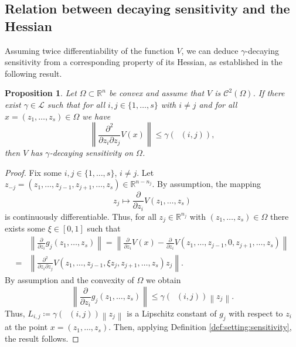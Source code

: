 \documentclass{article}
\newcommand{\R}{\mathbb{R}}
\newcommand{\Rn}{\R^n}
\newcommand{\C}{\mathcal{C}}
\renewcommand{\L}{\mathcal{L}}
\DeclareMathOperator{\distG}{\operatorname{dist_\mathcal{G}}} %
\newcommand{\agents}{\lbrace 1, \dots, s \rbrace}
\newcommand{\norm}[1]{\left\lVert {#1} \right\rVert}
\newtheorem{prop}{Proposition}[section]
\begin{document}
\subsection{Relation between decaying sensitivity and the Hessian}
Assuming twice differentiability of the function $V$, we can deduce $\gamma$-decaying sensitivity from a corresponding property of its Hessian, as established in the following result.
\begin{prop} \label{prop:Decay_Hessian}
    Let $\Omega \subset \Rn$ be convex and assume that $V$ is $\C^2(\Omega)$. If there exist $\gamma \in \L$ such that for all $i,j \in \agents$ with $i \neq j$ and for all $x = (z_1, \dots, z_s) \in \Omega$ we have 
    \begin{equation*}
      \norm{\frac{\partial^2}{\partial z_i \partial z_j} V(x)} \leq \gamma(\distG(i,j)), 
    \end{equation*}
    then $V$ has $\gamma$-decaying sensitivity on $\Omega$. 
\end{prop}
\begin{proof}
    Fix some $i,j \in \agents$, $i \neq j$. Let $z_{-j} = (z_1, \dots, z_{j-1}, z_{j+1}, \dots, z_s) \in \R^{n - n_j}$. By assumption, the mapping 
   \begin{equation*}
       z_j \mapsto \frac{\partial}{\partial z_i} V(z_1, \dots, z_s)
   \end{equation*}
   is continuously differentiable. Thus, for all $z_j \in \R^{n_j}$ with $(z_1, \dots, z_s) \in \Omega$ there exists some $\xi \in [0,1]$ such that 
   \begin{align*}
    & \norm{\frac{\partial}{\partial z_i} g_{j} (z_1, \dots, z_s)} 
    = \norm{ \frac{\partial}{\partial z_i} V(x) - \frac{\partial}{\partial z_i} V(z_1, \dots, z_{j-1}, 0, z_{j+1}, \dots, z_s)}  \\ 
    = &  \norm{\frac{\partial^2}{\partial z_i \partial z_j} V(z_1, \dots, z_{j-1}, \xi z_j, z_{j+1}, \dots, z_s) z_j }. 
   \end{align*}
    By assumption and the convexity of $\Omega$ we obtain 
   \begin{equation*}
       \norm{\frac{\partial}{\partial z_i} g_{j}(z_1, \dots, z_s)} \leq \gamma(\distG(i,j)) \norm{z_j}. 
   \end{equation*}
   Thus, $L_{i,j} \coloneqq \gamma(\distG(i,j)) \norm{z_j}$ is a Lipschitz constant of $g_j$ with respect to $z_i$ at the point $x = (z_1, \dots, z_s)$.   Then, applying Definition \ref{def:setting:sensitivity}, the result follows.
\end{proof}
\end{document}
